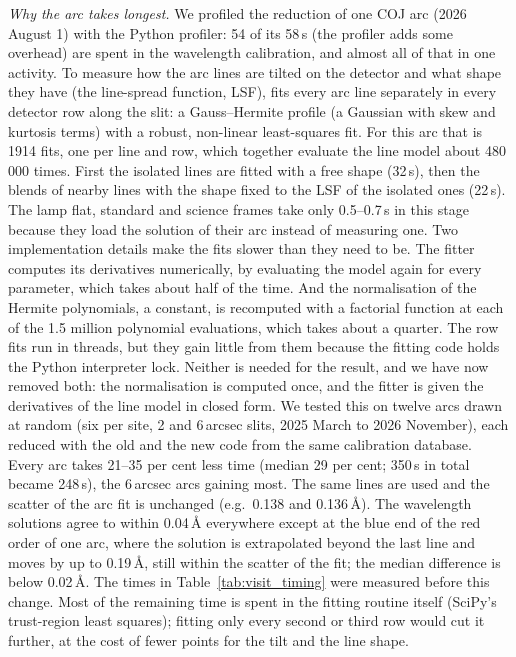 \textit{Why the arc takes longest.} We profiled the reduction of one COJ arc (2026 August 1) with the Python
profiler: 54 of its 58\,s (the profiler adds some overhead) are spent in the wavelength calibration, and almost all of
that in one activity. To measure how the arc lines are tilted on the detector and what shape they have (the
line-spread function, LSF), \banzai{} fits every arc line separately in every detector row along the slit: a
Gauss--Hermite profile (a Gaussian with skew and kurtosis terms) with a robust, non-linear least-squares fit. For this
arc that is 1914 fits, one per line and row, which together evaluate the line model about 480\,000 times. First the
isolated lines are fitted with a free shape (32\,s), then the blends of nearby lines with the shape fixed to the LSF of
the isolated ones (22\,s). The lamp flat, standard and science frames take only 0.5--0.7\,s in this stage because they
load the solution of their arc instead of measuring one. Two implementation details make the fits slower than they
need to be. The fitter computes its derivatives numerically, by evaluating the model again for every parameter, which
takes about half of the time. And the normalisation of the Hermite polynomials, a constant, is recomputed with a
factorial function at each of the 1.5 million polynomial evaluations, which takes about a quarter. The row fits run in
threads, but they gain little from them because the fitting code holds the Python interpreter lock. Neither is
needed for the result, and we have now removed both: the normalisation is computed once, and the fitter is given the
derivatives of the line model in closed form. We tested this on twelve arcs drawn at random (six per site, 2 and 6\,arcsec slits, 2025 March to 2026
November), each reduced with the old and the new code from the same calibration database. Every arc takes 21--35 per
cent less time (median 29 per cent; 350\,s in total became 248\,s), the 6\,arcsec arcs gaining most. The same lines
are used and the scatter of the arc fit is unchanged (e.g.\ 0.138 and 0.136\,\AA). The wavelength solutions agree
to within 0.04\,\AA{} everywhere except at the blue end of the red order of one arc, where the solution is
extrapolated beyond the last line and moves by up to 0.19\,\AA, still within the scatter of the fit; the median
difference is below 0.02\,\AA.
The times in Table~\ref{tab:visit_timing} were measured before this change. Most of the remaining time is spent in
the fitting routine itself (SciPy's trust-region least squares); fitting only every second or third row would cut it
further, at the cost of fewer points for the tilt and the line shape.

